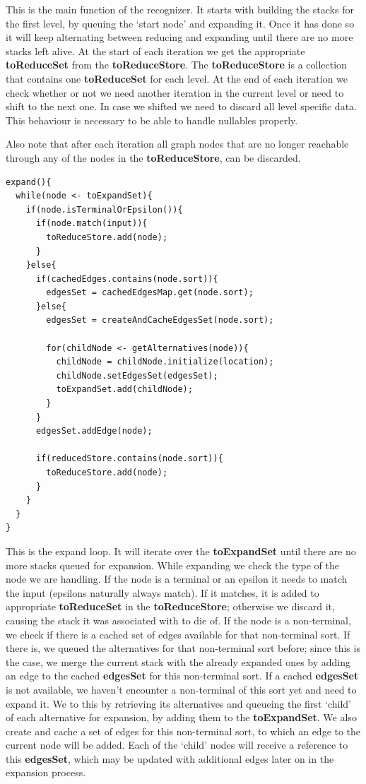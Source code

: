 \documentclass[a4paper,10pt]{article}
\begin{document}
This is the main function of the recognizer. It starts with building the stacks for the first level, by queuing the `start node' and expanding it. Once it has done so it will keep alternating between reducing and expanding until there are no more stacks left alive. At the start of each iteration we get the appropriate {\bf toReduceSet} from the {\bf toReduceStore}. The {\bf toReduceStore} is a collection that contains one {\bf toReduceSet} for each level. At the end of each iteration we check whether or not we need another iteration in the current level or need to shift to the next one. In case we shifted we need to discard all level specific data. This behaviour is necessary to be able to handle nullables properly.

Also note that after each iteration all graph nodes that are no longer reachable through any of the nodes in the {\bf toReduceStore}, can be discarded.

\pagebreak
{\small
\begin{verbatim}
expand(){
  while(node <- toExpandSet){
    if(node.isTerminalOrEpsilon()){
      if(node.match(input)){
        toReduceStore.add(node);
      }
    }else{
      if(cachedEdges.contains(node.sort)){
        edgesSet = cachedEdgesMap.get(node.sort);
      }else{
        edgesSet = createAndCacheEdgesSet(node.sort);
        
        for(childNode <- getAlternatives(node)){
          childNode = childNode.initialize(location);
          childNode.setEdgesSet(edgesSet);
          toExpandSet.add(childNode);
        }
      }
      edgesSet.addEdge(node);
      
      if(reducedStore.contains(node.sort)){
        toReduceStore.add(node);
      }
    }
  }
}
\end{verbatim}
}

This is the expand loop. It will iterate over the {\bf toExpandSet} until there are no more stacks queued for expansion. While expanding we check the type of the node we are handling. If the node is a terminal or an epsilon it needs to match the input (epsilons naturally always match). If it matches, it is added to appropriate {\bf toReduceSet} in the {\bf toReduceStore}; otherwise we discard it, causing the stack it was associated with to die of. If the node is a non-terminal, we check if there is a cached set of edges available for that non-terminal sort. If there is, we queued the alternatives for that non-terminal sort before; since this is the case, we merge the current stack with the already expanded ones by adding an edge to the cached {\bf edgesSet} for this non-terminal sort. If a cached {\bf edgesSet} is not available, we haven't encounter a non-terminal of this sort yet and need to expand it. We to this by retrieving its alternatives and queueing the first `child' of each alternative for expansion, by adding them to the {\bf toExpandSet}. We also create and cache a set of edges for this non-terminal sort, to which an edge to the current node will be added. Each of the `child' nodes will receive a reference to this {\bf edgesSet}, which may be updated with additional edges later on in the expansion process.
\end{document}
